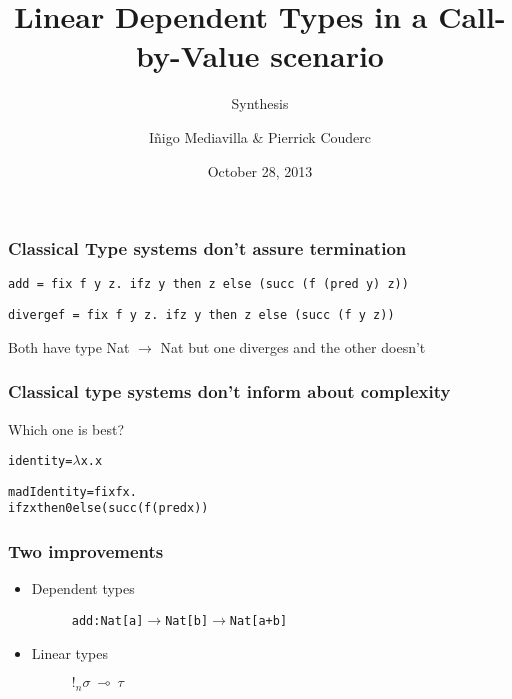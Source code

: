 \documentclass{beamer}
\title{Linear Dependent Types in a Call-by-Value scenario}
\subtitle{Synthesis}
\author{I\~{n}igo Mediavilla \& Pierrick Couderc}
\date{October 28, 2013}
\begin{document}
\begin{frame}
  \maketitle
\end{frame}

\begin{frame}[fragile]
\frametitle{Classical Type systems don't assure termination}


\begin{verbatim}
add = fix f y z. ifz y then z else (succ (f (pred y) z))
\end{verbatim}

\begin{verbatim}
divergef = fix f y z. ifz y then z else (succ (f y z))
\end{verbatim}
Both have type Nat $\rightarrow$ Nat but one diverges and the other doesn't
\end{frame}

\begin{frame}[fragile]
  \frametitle{Classical type systems don't inform about complexity}
  Which one is best? 
  \begin{alltt}
    identity = \(\lambda\)x. x 
  \end{alltt}
  \begin{alltt}
    madIdentity = fix f x. 
                    ifz x then 0 else (succ (f (pred x))
  \end{alltt}
\end{frame}

\begin{frame}[fragile]
  \frametitle{Two improvements}
  \begin{itemize}
  \item Dependent types
    \begin{figure}
\begin{alltt}
 add : Nat[a] \(\rightarrow\) Nat[b] \(\rightarrow\) Nat[a+b]
\end{alltt}
    \end{figure}
  \item Linear types \\
    \begin{figure}
      \begin{center}
        $!_{n} \sigma ~\multimap~\tau$
      \end{center}
    \end{figure}
  \end{itemize}
\end{frame}
\end{document}
